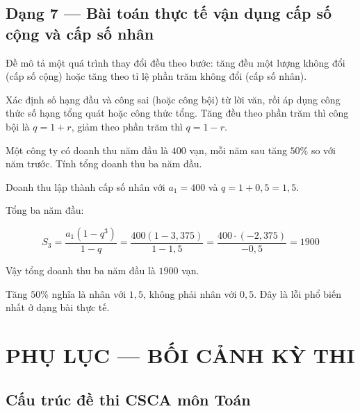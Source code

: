 \documentclass[11pt, a4paper]{article}
\begin{document}
\subsection{Dạng 7 — Bài toán thực tế vận dụng cấp số cộng và cấp số nhân}

 Đề mô tả một quá trình thay đổi đều theo bước: tăng đều một lượng không đổi (cấp số cộng) hoặc tăng theo tỉ lệ phần trăm không đổi (cấp số nhân).

 Xác định số hạng đầu và công sai (hoặc công bội) từ lời văn, rồi áp dụng công thức số hạng tổng quát hoặc công thức tổng. Tăng đều theo phần trăm thì công bội là $q = 1 + r$, giảm theo phần trăm thì $q = 1 - r$.

\begin{vidu}[{7}]
Một công ty có doanh thu năm đầu là $400$ vạn, mỗi năm sau tăng $50\%$ so với năm trước. Tính tổng doanh thu ba năm đầu.

Doanh thu lập thành cấp số nhân với $a_1 = 400$ và $q = 1 + 0{,}5 = 1{,}5$.

Tổng ba năm đầu:

$$S_3 = \frac{a_1(1 - q^3)}{1 - q} = \frac{400(1 - 3{,}375)}{1 - 1{,}5} = \frac{400 \cdot (-2{,}375)}{-0{,}5} = 1900$$

Vậy tổng doanh thu ba năm đầu là $1900$ vạn.

 Tăng $50\%$ nghĩa là nhân với $1{,}5$, không phải nhân với $0{,}5$. Đây là lỗi phổ biến nhất ở dạng bài thực tế.

\end{vidu}
\section{PHỤ LỤC — BỐI CẢNH KỲ THI}

\subsection{Cấu trúc đề thi CSCA môn Toán}

\end{document}
